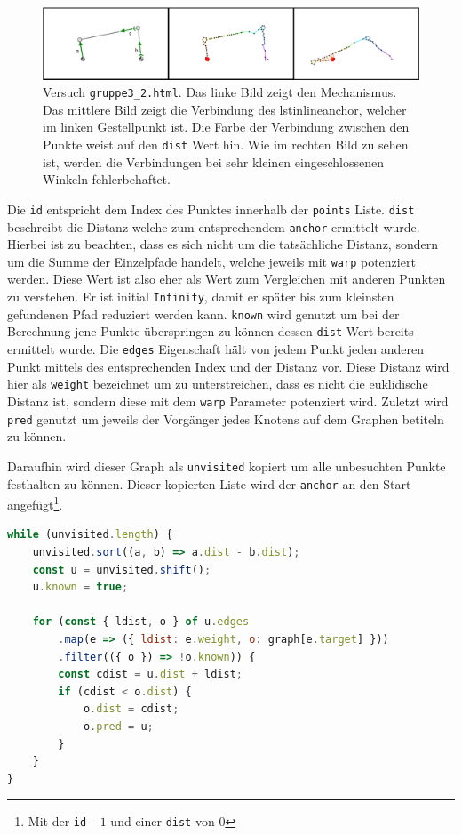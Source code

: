 \begin{figure}
    \centering
    \includegraphics[width=\textwidth]{gfx/dijkstra_edit.png}
    \caption[Versuch \lstinline{gruppe3_2.html}]{Versuch \lstinline{gruppe3_2.html}. Das linke Bild zeigt den Mechanismus. Das mittlere Bild zeigt die Verbindung des lstinline{anchor}, welcher im linken Gestellpunkt ist. Die Farbe der Verbindung zwischen den Punkte weist auf den \lstinline{dist} Wert hin.
    Wie im rechten Bild zu sehen ist, werden die Verbindungen bei sehr kleinen eingeschlossenen Winkeln fehlerbehaftet.}
    \label{fig:gruppe3_1}
\end{figure}

Die \lstinline{id} entspricht dem Index des Punktes innerhalb der \lstinline{points} Liste.
\lstinline{dist} beschreibt die Distanz welche zum entsprechendem \lstinline{anchor} ermittelt wurde.
Hierbei ist zu beachten, dass es sich nicht um die tatsächliche Distanz, sondern um die Summe der Einzelpfade handelt, welche jeweils mit \lstinline{warp} potenziert werden.
Diese Wert ist also eher als Wert zum Vergleichen mit anderen Punkten zu verstehen.
Er ist initial \lstinline{Infinity}, damit er später bis zum kleinsten gefundenen Pfad reduziert werden kann.
\lstinline{known} wird genutzt um bei der Berechnung jene Punkte überspringen zu können dessen \lstinline{dist} Wert bereits ermittelt wurde.
Die \lstinline{edges} Eigenschaft hält von jedem Punkt jeden anderen Punkt mittels des entsprechenden Index und der Distanz vor.
Diese Distanz wird hier als \lstinline{weight} bezeichnet um zu unterstreichen, dass es nicht die euklidische Distanz ist, sondern diese mit dem \lstinline{warp} Parameter potenziert wird.
Zuletzt wird \lstinline{pred} genutzt um jeweils der Vorgänger jedes Knotens auf dem Graphen betiteln zu können.

Daraufhin wird dieser Graph als \lstinline{unvisited} kopiert um alle unbesuchten Punkte festhalten zu können.
Dieser kopierten Liste wird der \lstinline{anchor} an den Start angefügt\footnote{Mit der \lstinline{id} $-1$ und einer \lstinline{dist} von 0}.

\begin{lstlisting}[language=JavaScript, caption={Berechnung der \lstinline{dist} Eigenschaft der einzelnen Objekte aus dem Dijkstra-Graphen.}, label={lst:creation_dijkstra_graph}]
while (unvisited.length) {
    unvisited.sort((a, b) => a.dist - b.dist);
    const u = unvisited.shift();
    u.known = true;

    for (const { ldist, o } of u.edges
        .map(e => ({ ldist: e.weight, o: graph[e.target] }))
        .filter(({ o }) => !o.known)) {
        const cdist = u.dist + ldist;
        if (cdist < o.dist) {
            o.dist = cdist;
            o.pred = u;
        }
    }
}
\end{lstlisting}

